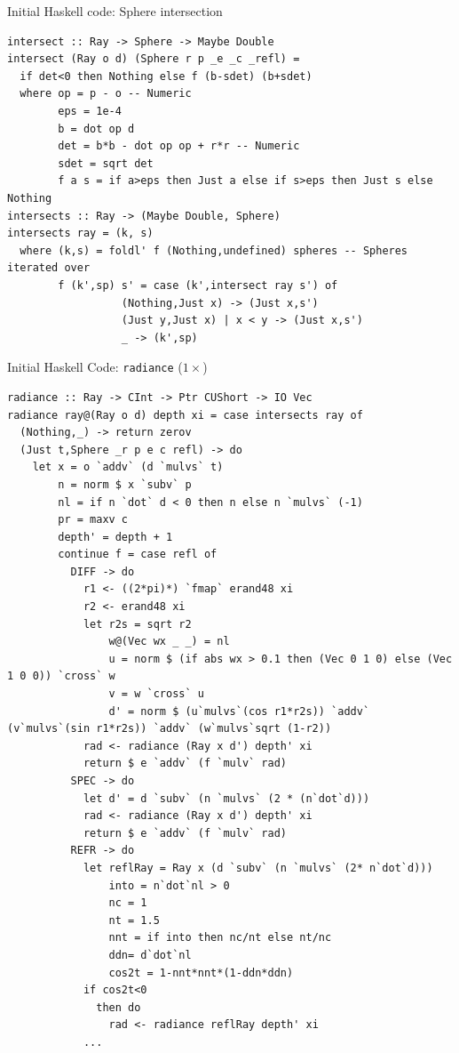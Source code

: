 \documentclass[8pt]{beamer}
\newcommand{\raw}[1]{\texttt{#1}}
\begin{document}
\begin{frame}[fragile]{Initial Haskell code: Sphere intersection}
\begin{verbatim}
intersect :: Ray -> Sphere -> Maybe Double
intersect (Ray o d) (Sphere r p _e _c _refl) =
  if det<0 then Nothing else f (b-sdet) (b+sdet)
  where op = p - o -- Numeric
        eps = 1e-4
        b = dot op d
        det = b*b - dot op op + r*r -- Numeric
        sdet = sqrt det
        f a s = if a>eps then Just a else if s>eps then Just s else Nothing
intersects :: Ray -> (Maybe Double, Sphere)
intersects ray = (k, s)
  where (k,s) = foldl' f (Nothing,undefined) spheres -- Spheres iterated over
        f (k',sp) s' = case (k',intersect ray s') of
                  (Nothing,Just x) -> (Just x,s')
                  (Just y,Just x) | x < y -> (Just x,s')
                  _ -> (k',sp)
\end{verbatim}
\end{frame}

\begin{frame}[fragile]{Initial Haskell Code: \texttt{radiance} ($1\times$) }
\begin{verbatim}
radiance :: Ray -> CInt -> Ptr CUShort -> IO Vec
radiance ray@(Ray o d) depth xi = case intersects ray of
  (Nothing,_) -> return zerov
  (Just t,Sphere _r p e c refl) -> do
    let x = o `addv` (d `mulvs` t)
        n = norm $ x `subv` p
        nl = if n `dot` d < 0 then n else n `mulvs` (-1)
        pr = maxv c
        depth' = depth + 1
        continue f = case refl of
          DIFF -> do
            r1 <- ((2*pi)*) `fmap` erand48 xi
            r2 <- erand48 xi
            let r2s = sqrt r2
                w@(Vec wx _ _) = nl
                u = norm $ (if abs wx > 0.1 then (Vec 0 1 0) else (Vec 1 0 0)) `cross` w
                v = w `cross` u
                d' = norm $ (u`mulvs`(cos r1*r2s)) `addv` (v`mulvs`(sin r1*r2s)) `addv` (w`mulvs`sqrt (1-r2))
            rad <- radiance (Ray x d') depth' xi
            return $ e `addv` (f `mulv` rad)
          SPEC -> do
            let d' = d `subv` (n `mulvs` (2 * (n`dot`d)))
            rad <- radiance (Ray x d') depth' xi
            return $ e `addv` (f `mulv` rad)
          REFR -> do
            let reflRay = Ray x (d `subv` (n `mulvs` (2* n`dot`d)))
                into = n`dot`nl > 0                
                nc = 1
                nt = 1.5
                nnt = if into then nc/nt else nt/nc
                ddn= d`dot`nl
                cos2t = 1-nnt*nnt*(1-ddn*ddn)
            if cos2t<0
              then do
                rad <- radiance reflRay depth' xi
            ...
\end{verbatim}

\end{frame}
\end{document}
